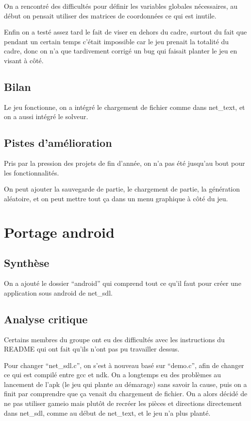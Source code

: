 \documentclass[12pt]{article}
\begin{document}
On a rencontré des difficultés pour définir les variables globales nécessaires, au début on pensait utiliser des matrices de coordonnées ce qui est inutile.

Enfin on a testé assez tard le fait de viser en dehors du cadre, surtout du fait que pendant un certain temps c'était impossible car le jeu prenait la totalité du cadre, donc on n'a que tardivement corrigé un bug qui faisait planter le jeu en visant  à côté.
\subsection{Bilan}
Le jeu fonctionne, on a intégré le chargement de fichier comme dans net\_text, et on a aussi intégré le solveur.
\subsection{Pistes d'amélioration}
Pris par la pression des projets de fin d'année, on n'a pas été jusqu'au bout pour les fonctionnalités.

On peut ajouter la sauvegarde de partie, le chargement de partie, la génération aléatoire, et on peut mettre tout ça dans un menu graphique à côté du jeu.



\section{Portage android}
\subsection{Synthèse}
On a ajouté le dossier ``android'' qui comprend tout ce qu'il faut pour créer une application sous android de net\_sdl.
\subsection{Analyse critique}
Certains membres du groupe ont eu des difficultés avec les instructions du README qui ont fait qu'ils n'ont pas pu travailler dessus.

Pour changer ``net\_sdl.c'', on s'est à nouveau basé sur ``demo.c'', afin de changer ce qui est compilé entre gcc et ndk. On a longtemps eu des problèmes au lancement de l'apk (le jeu qui plante au démarage) sans savoir la cause, puis on a finit par comprendre que ça venait du chargement de fichier. On a alors décidé de ne pas utiliser gameio mais plutôt de recréer les pièces et directions directement dans net\_sdl, comme au début de net\_text, et le jeu n'a plus planté.
\end{document}
